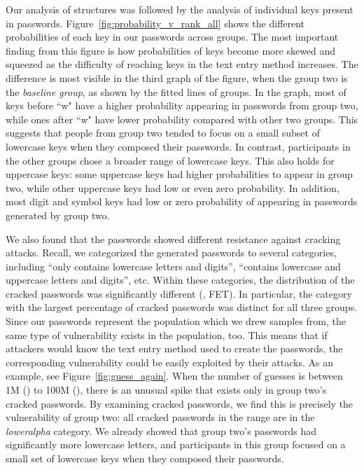 \documentclass[conference]{IEEEtran}
\begin{document}
Our analysis of structures was followed by the analysis of individual keys present in passwords. Figure~\ref{fig:probability_v_rank_all} shows the different probabilities of each key in our passwords across groups. The most important finding from this figure is how probabilities of keys become more skewed and squeezed as the difficulty of reaching keys in the text entry method increases. The difference is most visible in the third graph of the figure, when the group two is the \emph{baseline group}, as shown by the fitted lines of groups. In the graph, most of keys before ``w" have a higher probability appearing in passwords from group two, while ones after ``w" have lower probability compared with other two groups. This suggests that people from group two tended to focus on a small subset of lowercase keys when they composed their passwords. In contrast, participants in the other groups chose a broader range of lowercase keys. This also holds for uppercase keys: some uppercase keys had higher probabilities to appear in group two, while other uppercase keys had low or even zero probability. In addition, most digit and symbol keys had low or zero probability of appearing in passwords generated by group two. 


We also found that the passwords showed different resistance against cracking attacks. Recall, we categorized the generated passwords to several categories, including ``only contains lowercase letters and digits'', ``contains lowercase and uppercase letters and digits'', etc. Within these categories, the distribution of the cracked passwords was significantly different (, FET). In particular, the category with the largest percentage of cracked passwords was distinct for all three groups. Since our passwords represent the population which we drew samples from, the same type of vulnerability exists in the population, too. This means that if attackers would know the text entry method used to create the passwords, the corresponding vulnerability could be easily exploited by their attacks. As an example, see Figure~\ref{fig:guess_again}. When the number of guesses is between 1M () to 100M (), there is an unusual spike that exists only in group two's cracked passwords. By examining cracked passwords, we find this is precisely the vulnerability of group two: all cracked passwords in the range are in the \emph{loweralpha} category. We already showed that group two's passwords had significantly more lowercase letters, and participants in this group focused on a small set of lowercase keys when they composed their passwords. 
\end{document}
